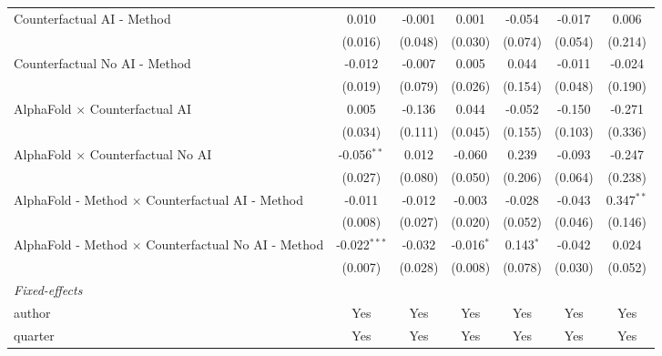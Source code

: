 \begin{tabular}{lcccccc}
   Counterfactual AI - Method                                 & 0.010          & -0.001      & 0.001         & -0.054      & -0.017        & 0.006\\   
                                                              & (0.016)        & (0.048)     & (0.030)       & (0.074)     & (0.054)       & (0.214)\\   
   Counterfactual No AI - Method                              & -0.012         & -0.007      & 0.005         & 0.044       & -0.011        & -0.024\\   
                                                              & (0.019)        & (0.079)     & (0.026)       & (0.154)     & (0.048)       & (0.190)\\   
   AlphaFold $\times$ Counterfactual AI                       & 0.005          & -0.136      & 0.044         & -0.052      & -0.150        & -0.271\\   
                                                              & (0.034)        & (0.111)     & (0.045)       & (0.155)     & (0.103)       & (0.336)\\   
   AlphaFold $\times$ Counterfactual No AI                    & -0.056$^{**}$  & 0.012       & -0.060        & 0.239       & -0.093        & -0.247\\   
                                                              & (0.027)        & (0.080)     & (0.050)       & (0.206)     & (0.064)       & (0.238)\\   
   AlphaFold - Method $\times$ Counterfactual AI - Method     & -0.011         & -0.012      & -0.003        & -0.028      & -0.043        & 0.347$^{**}$\\   
                                                              & (0.008)        & (0.027)     & (0.020)       & (0.052)     & (0.046)       & (0.146)\\   
   AlphaFold - Method $\times$ Counterfactual No AI - Method  & -0.022$^{***}$ & -0.032      & -0.016$^{*}$  & 0.143$^{*}$ & -0.042        & 0.024\\   
                                                              & (0.007)        & (0.028)     & (0.008)       & (0.078)     & (0.030)       & (0.052)\\   
   \midrule
   \emph{Fixed-effects}\\
   author                                                     & Yes            & Yes         & Yes           & Yes         & Yes           & Yes\\  
   quarter                                                    & Yes            & Yes         & Yes           & Yes         & Yes           & Yes\\  

\end{tabular}
